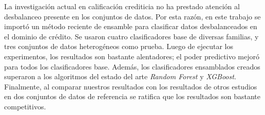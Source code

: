 \begin{resumen}
La investigación actual en calificación crediticia no ha prestado atención al desbalanceo presente en los conjuntos de datos. Por esta razón, en este trabajo se importó un método reciente de ensamble para clasificar datos desbalanceados en el dominio de crédito. Se usaron cuatro clasificadores base de diversas familias, y tres conjuntos de datos heterogéneos como prueba. Luego de ejecutar los experimentos, los resultados son bastante alentadores; el poder predictivo mejoró para todos los clasificadores base. Además, los clasificadores ensamblados creados superaron a los algoritmos del estado del arte \textit{Random Forest} y \textit{XGBoost}. Finalmente, al comparar nuestros resultados con los resultados de otros estudios en dos conjuntos de datos de referencia se ratifica que los resultados son bastante competitivos.
\end{resumen}
